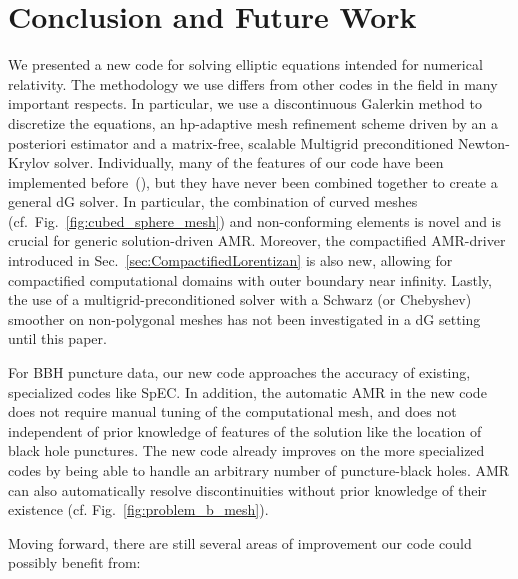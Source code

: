 %
\section{Conclusion and Future Work}
\label{sec:Conclusions}
%

We presented a new code for solving
elliptic equations intended for numerical
relativity. The methodology we use differs from other codes in the
field in many important respects. In particular, we use a
discontinuous Galerkin method to discretize the equations, an
hp-adaptive mesh refinement scheme driven by an a posteriori estimator
and a matrix-free, scalable Multigrid preconditioned Newton-Krylov
solver.
Individually, many of the features of our
  code have been implemented before~(\cite{kozdon2018energy,kozdon2019robust,stiller2017robust,sundar2012parallel,hesthaven2008nodal}), but they have never been combined together to create a general dG solver.  In particular, the combination of curved meshes (cf.\ Fig.~\ref{fig:cubed_sphere_mesh}) and non-conforming elements
  is novel and is crucial for generic solution-driven AMR.  Moreover,
  the compactified AMR-driver introduced in
  Sec.~\ref{sec:CompactifiedLorentizan} is also new, allowing for compactified computational domains with outer boundary near infinity. Lastly, the use of a multigrid-preconditioned solver with a Schwarz (or Chebyshev) smoother on non-polygonal meshes has not been investigated in a dG setting until this paper.


For BBH puncture data, our new code approaches the accuracy of
  existing, specialized codes like SpEC.  In addition, the automatic
  AMR in the new code does not require manual tuning of the
  computational mesh, and does not independent of prior knowledge of
  features of the solution like the location of black hole punctures.
  The new code already improves on the more specialized codes by being
  able to handle an arbitrary number of puncture-black holes.  AMR can
  also automatically resolve discontinuities without prior knowledge
  of their existence (cf. Fig.~\ref{fig:problem_b_mesh}).

  Moving forward, there are
still several areas of improvement our code could possibly benefit
from:

